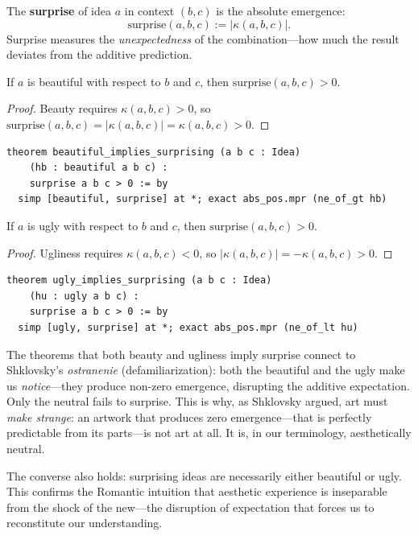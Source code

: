 \begin{definition}[Surprise]
\label{def:surprise}
The \textbf{surprise} of idea $a$ in context $(b, c)$ is the absolute
emergence:
\[
  \mathrm{surprise}(a, b, c) := |\kappa(a, b, c)|.
\]
Surprise measures the \emph{unexpectedness} of the combination---how
much the result deviates from the additive prediction.
\end{definition}

\begin{theorem}
\label{thm:beautiful-surprising}
If $a$ is beautiful with respect to $b$ and $c$, then
$\mathrm{surprise}(a, b, c) > 0$.
\end{theorem}

\begin{proof}
Beauty requires $\kappa(a, b, c) > 0$, so
$\mathrm{surprise}(a, b, c) = |\kappa(a, b, c)| = \kappa(a, b, c) > 0$.
\end{proof}

\begin{lstlisting}
theorem beautiful_implies_surprising (a b c : Idea)
    (hb : beautiful a b c) :
    surprise a b c > 0 := by
  simp [beautiful, surprise] at *; exact abs_pos.mpr (ne_of_gt hb)
\end{lstlisting}

\begin{theorem}
\label{thm:ugly-surprising}
If $a$ is ugly with respect to $b$ and $c$, then
$\mathrm{surprise}(a, b, c) > 0$.
\end{theorem}

\begin{proof}
Ugliness requires $\kappa(a, b, c) < 0$, so
$|\kappa(a, b, c)| = -\kappa(a, b, c) > 0$.
\end{proof}

\begin{lstlisting}
theorem ugly_implies_surprising (a b c : Idea)
    (hu : ugly a b c) :
    surprise a b c > 0 := by
  simp [ugly, surprise] at *; exact abs_pos.mpr (ne_of_lt hu)
\end{lstlisting}

\begin{interpretation}
\label{int:defamiliarization}
The theorems that both beauty and ugliness imply surprise connect to
Shklovsky's \emph{ostranenie} (defamiliarization): both the beautiful and
the ugly make us \emph{notice}---they produce non-zero emergence, disrupting
the additive expectation.  Only the neutral fails to surprise.  This is
why, as Shklovsky argued, art must \emph{make strange}: an artwork that
produces zero emergence---that is perfectly predictable from its parts---is
not art at all.  It is, in our terminology, aesthetically neutral.

The converse also holds: surprising ideas are necessarily either beautiful
or ugly.  This confirms the Romantic intuition that aesthetic experience
is inseparable from the shock of the new---the disruption of expectation
that forces us to reconstitute our understanding.
\end{interpretation}

